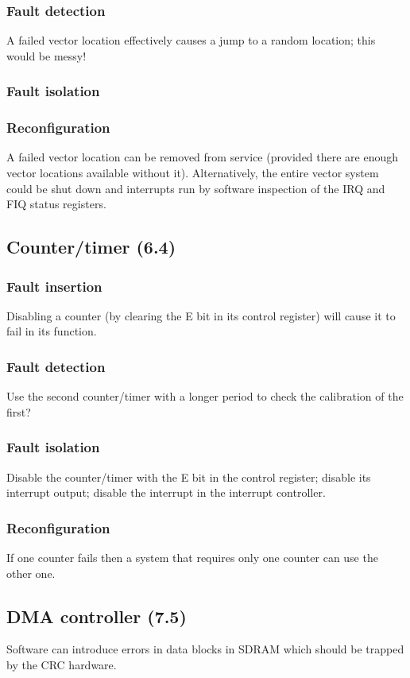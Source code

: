 \documentclass[12pt]{article}
\begin{document}
\subsubsection*{Fault detection}
A failed vector location effectively causes a jump to a random location; this would be messy!
\subsubsection*{Fault isolation}
\subsubsection*{Reconfiguration}
A failed vector location can be removed from service (provided there are enough vector locations
available without it). Alternatively, the entire vector system could be shut down and interrupts run
by software inspection of the IRQ and FIQ status registers.

\subsection{Counter/timer (6.4)}
\subsubsection*{Fault insertion}
Disabling a counter (by clearing the E bit in its control register) will cause it to fail in its function.
\subsubsection*{Fault detection}
Use the second counter/timer with a longer period to check the calibration of the first?
\subsubsection*{Fault isolation}
Disable the counter/timer with the E bit in the control register; disable its interrupt output; disable
the interrupt in the interrupt controller.
\subsubsection*{Reconfiguration}
If one counter fails then a system that requires only one counter can use the other one.

\subsection{DMA controller (7.5)}
Software can introduce errors in data blocks in SDRAM which should be trapped by the CRC
hardware.
\end{document}
